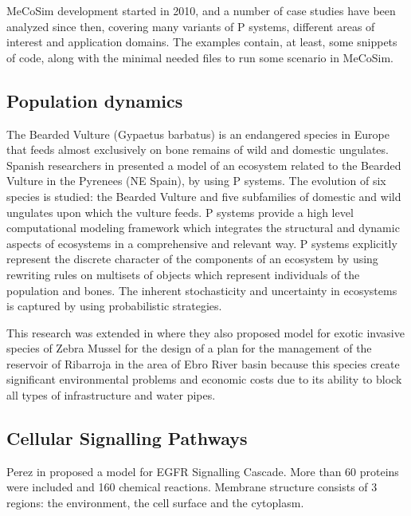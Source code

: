 MeCoSim development started in 2010, and a number of case studies have been analyzed since then, covering many variants of P systems, different areas of interest and application domains. The examples contain, at least, some snippets of code, along with the minimal needed files to run some scenario in MeCoSim.


\subsection{Population dynamics} %
\label{sub:population_dynamics}

The Bearded Vulture (Gypaetus barbatus) is an endangered species in Europe that feeds almost exclusively on bone remains of wild and domestic ungulates. Spanish researchers in \cite{Cardona:2009:Vultures} presented a model of an ecosystem related to the Bearded Vulture in the Pyrenees (NE Spain), by using P systems. The evolution of six species is studied: the Bearded Vulture and five subfamilies of domestic and wild ungulates upon which the vulture feeds. P systems provide a high level computational modeling framework which integrates the structural and dynamic aspects of ecosystems in a comprehensive and relevant way. P systems explicitly represent the discrete character of the components of an ecosystem by using rewriting rules on multisets of objects which represent individuals of the population and bones. The inherent stochasticity and uncertainty in ecosystems is captured by using probabilistic strategies.

This research was extended in \cite{Cardona11Zebra} where they also proposed model for exotic invasive species of Zebra Mussel for the design of a plan for the management of the reservoir of Ribarroja in the area of Ebro River basin because this species create significant environmental problems and economic costs due to its ability to block all types of infrastructure and water pipes.


\subsection{Cellular Signalling Pathways} %
\label{sub:cellular_signalling_pathways}

Perez in \cite{Perez06EGFR} proposed a model for EGFR Signalling Cascade. More than 60 proteins were included and 160 chemical reactions. Membrane structure consists of 3 regions: the environment, the cell surface and the cytoplasm. 

